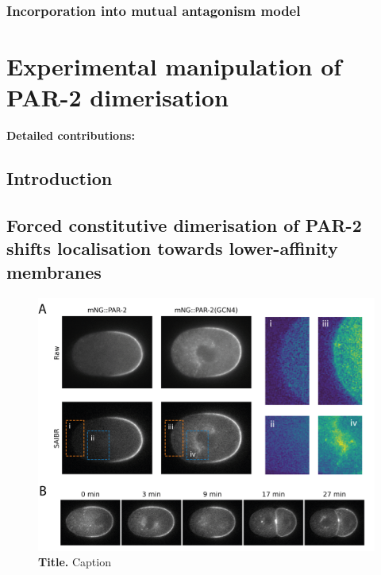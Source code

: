 \documentclass[12pt]{"report"}
\newcommand{\mycaption}[2]{\caption[#1]{\textbf{#1.} #2}}
\begin{document}
\subsection{Incorporation into mutual antagonism model}


\clearpage
\chapter{Experimental manipulation of PAR-2 dimerisation}

\textbf{Detailed contributions:}\\

\clearpage
\section{Introduction}

\section{Forced constitutive dimerisation of PAR-2 shifts localisation towards lower-affinity membranes}



\begin{figure}[!h]
\includegraphics[scale=1]{gcn4}
\setlength{\abovecaptionskip}{20pt}
\centering
\mycaption{Title}{Caption}
\label{fig:gcn4}
\end{figure}
\end{document}
